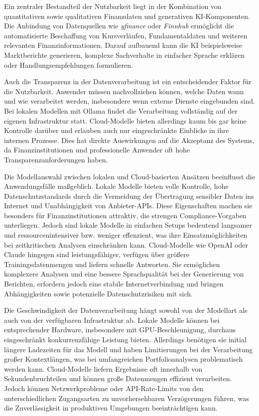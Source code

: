     Ein zentraler Bestandteil der Nutzbarkeit liegt in der Kombination von quantitativen sowie qualitativen Finanzdaten und generativen \acs{KI}-Komponenten.
    Die Anbindung von Datenquellen wie \textit{yfinance} oder \textit{Finnhub} ermöglicht die automatisierte Beschaffung von Kursverläufen, Fundamentaldaten und weiteren relevanten Finanzinformationen.
    Darauf aufbauend kann die \acs{KI} beispielsweise Marktberichte generieren, komplexe Sachverhalte in einfacher Sprache erklären oder Handlungsempfehlungen formulieren.

    Auch die Transparenz in der Datenverarbeitung ist ein entscheidender Faktor für die Nutzbarkeit.
    Anwender müssen nachvollziehen können, welche Daten wann und wie verarbeitet werden, insbesondere wenn externe Dienste eingebunden sind.
    Bei lokalen Modellen mit Ollama findet die Verarbeitung vollständig auf der eigenen Infrastruktur statt.
    Cloud-Modelle bieten allerdings kaum bis gar keine Kontrolle darüber und erlauben auch nur eingeschränkte Einblicke in ihre internen Prozesse.
    Dies hat direkte Auswirkungen auf die Akzeptanz des Systems, da Finanzinstitutionen und professionelle Anwender oft hohe Transparenzanforderungen haben.

    Die Modellauswahl zwischen lokalen und Cloud-basierten Ansätzen beeinflusst die Anwendungsfälle maßgeblich.
    Lokale Modelle bieten volle Kontrolle, hohe Datenschutzstandards durch die Vermeidung der Übertragung sensibler Daten ins Internet und Unabhängigkeit von Anbieter-\acs{API}s.
    Diese Eigenschaften machen sie besonders für Finanzinstitutionen attraktiv, die strengen Compliance-Vorgaben unterliegen.
    Jedoch sind lokale Modelle in einfachen Setups bedeutend langsamer und ressourcenintensiver bzw. weniger effenzient, was ihre Einsatzmöglichkeiten bei zeitkritischen Analysen einschränken kann.
    Cloud-Modelle wie OpenAI oder Claude hingegen sind leistungsfähiger, verfügen über größere Trainingsdatenmengen und liefern schnelle Antworten.
    Sie ermöglichen komplexere Analysen und eine bessere Sprachqualität bei der Generierung von Berichten, erfordern jedoch eine stabile Internetverbindung und bringen Abhängigkeiten sowie potenzielle Datenschutzrisiken mit sich.

    Die Geschwindigkeit der Datenverarbeitung hängt sowohl von der Modellart als auch von der verfügbaren Infrastruktur ab.
    Lokale Modelle können bei entsprechender Hardware, insbesondere mit \acs{GPU}-Beschleunigung, durchaus eingeschränkt konkurrenzfähige Leistung bieten.
    Allerdings benötigen sie initial längere Ladezeiten für das Modell und haben Limitierungen bei der Verarbeitung großer Kontextlängen, was bei umfangreichen Portfolioanalysen problematisch werden kann.
    Cloud-Modelle liefern Ergebnisse oft innerhalb von Sekundenbruchteilen und können große Datenmengen effizient verarbeiten.
    Jedoch können Netzwerkprobleme oder \acs{API}-Rate-Limits von den unterschiedlichen Zugangsarten zu unvorhersehbaren Verzögerungen führen, was die Zuverlässigkeit in produktiven Umgebungen beeinträchtigen kann.

